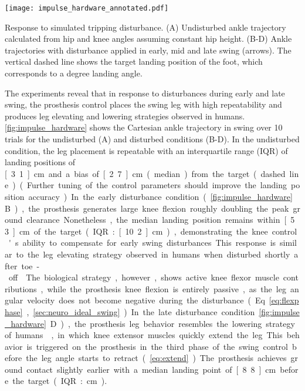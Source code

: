 \begin{marginfigure}[1in]
    \centering
    \texttt{[image: impulse\_hardware\_annotated.pdf]}
    \caption{Response to simulated tripping disturbance. (A) Undisturbed ankle
    trajectory calculated from hip and knee angles assuming constant hip height.
    (B-D) Ankle trajectories with disturbance applied in early, mid and late
    swing (arrows). The vertical dashed line shows the target landing position
    of the foot, which corresponds to a \unit[75]{degree} landing angle.}
    \label{fig:impulse_hardware}
\end{marginfigure}

The experiments reveal that in response to disturbances during early and late
swing, the prosthesis control places the swing leg with high repeatability and
produces leg elevating and lowering strategies observed in humans.
\cref{fig:impulse_hardware} shows the Cartesian ankle trajectory in swing over
10 trials for the undisturbed (A) and disturbed conditions (B-D). In the
undisturbed condition, the leg placement is repeatable with an interquartile
range (IQR) of landing positions of \unit[3.1]{cm} and a bias of \unit[2.7]{cm}
(median) from the target (dashed line).  (Further tuning of the control
parameters should improve the landing position accuracy.)

In the early disturbance condition (\cref{fig:impulse_hardware}B), the
prosthesis generates large knee flexion roughly doubling the peak ground
clearance. Nonetheless, the median landing position remains within
\unit[5.3]{cm} of the target (IQR: \unit[10.2]{cm}), demonstrating the knee
control's ability to compensate for early swing disturbances. This response is
similar to the leg elevating strategy observed in humans when disturbed shortly
after toe-off \citep{eng1994strategies, schillings2000muscular}. The biological
strategy, however, shows active knee flexor muscle contributions, while the
prosthesis knee flexion is entirely passive, as the leg angular velocity does
not become negative during the disturbance (Eq.~\ref{eq:flexphase},
\cref{sec:neuro_ideal_swing}).

In the late disturbance condition \cref{fig:impulse_hardware}D),
the prosthesis leg behavior resembles the lowering strategy of
humans~\citep{schillings2000muscular}, in which knee extensor muscles quickly
extend the leg. This behavior is triggered on the prosthesis in the third phase
of the swing control before the leg angle starts to retract
(\cref{eq:extend}). The prosthesis achieves ground contact slightly earlier
with a median landing point of \unit[8.8]{cm} before the target (IQR:
\unit[3]{cm}).

